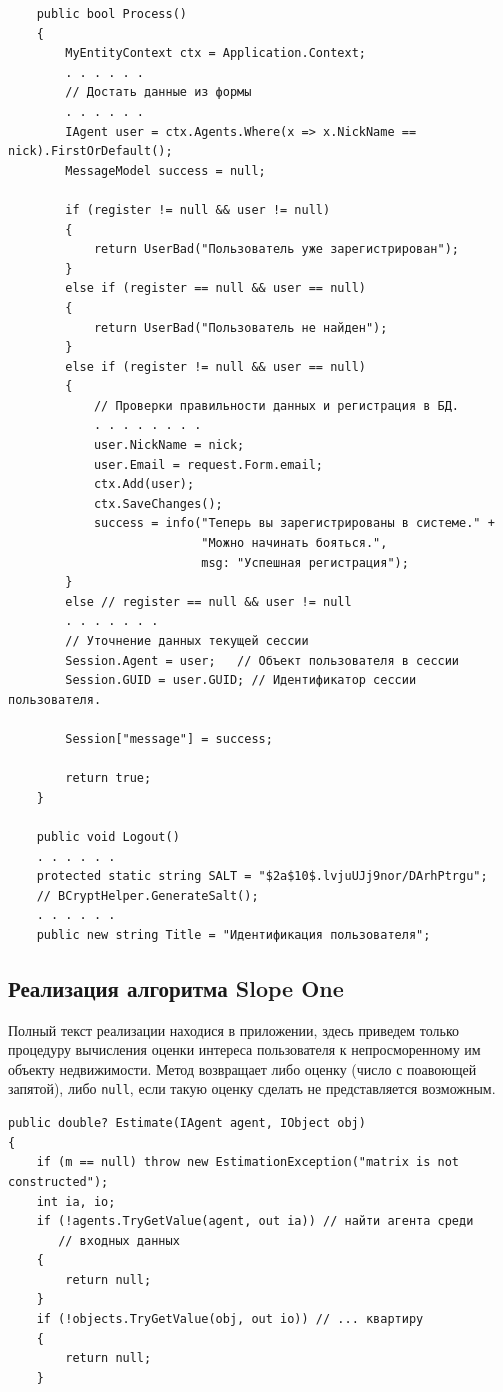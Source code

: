 \documentclass[a4paper,14pt,openany,final]{extreport} %
\begin{document}
{\begin{verbatim}
    public bool Process()
    {
        MyEntityContext ctx = Application.Context;
        . . . . . .
        // Достать данные из формы
        . . . . . .
        IAgent user = ctx.Agents.Where(x => x.NickName == nick).FirstOrDefault();
        MessageModel success = null;

        if (register != null && user != null)
        {
            return UserBad("Пользователь уже зарегистрирован");
        }
        else if (register == null && user == null)
        {
            return UserBad("Пользователь не найден");
        }
        else if (register != null && user == null)
        {
            // Проверки правильности данных и регистрация в БД.
            . . . . . . . .
            user.NickName = nick;
            user.Email = request.Form.email;
            ctx.Add(user);
            ctx.SaveChanges();
            success = info("Теперь вы зарегистрированы в системе." +
                           "Можно начинать бояться.",
                           msg: "Успешная регистрация");
        }
        else // register == null && user != null
        . . . . . . .
        // Уточнение данных текущей сессии
        Session.Agent = user;   // Объект пользователя в сессии
        Session.GUID = user.GUID; // Идентификатор сессии пользователя.

        Session["message"] = success;

        return true;
    }

    public void Logout()
    . . . . . .
    protected static string SALT = "$2a$10$.lvjuUJj9nor/DArhPtrgu";
    // BCryptHelper.GenerateSalt();
    . . . . . .
    public new string Title = "Идентификация пользователя";
\end{verbatim}

\subsection{Реализация алгоритма Slope One}
Полный текст реализации находися в приложении, здесь приведем только процедуру вычисления оценки интереса пользователя к непросморенному им объекту недвижимости. Метод возвращает либо оценку (число с поавоющей запятой), либо \verb|null|, если такую оценку сделать не представляется возможным.
\begin{verbatim}
public double? Estimate(IAgent agent, IObject obj)
{
    if (m == null) throw new EstimationException("matrix is not constructed");
    int ia, io;
    if (!agents.TryGetValue(agent, out ia)) // найти агента среди
       // входных данных
    {
        return null;
    }
    if (!objects.TryGetValue(obj, out io)) // ... квартиру
    {
        return null;
    }


\end{verbatim}}
\end{document}
